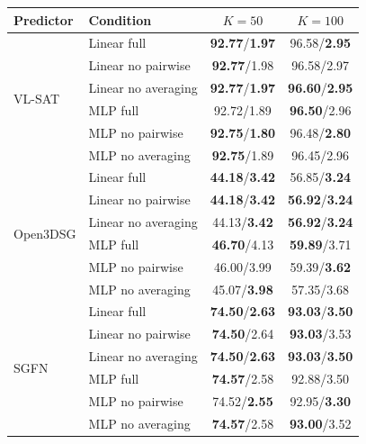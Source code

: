\begin{center}
\centering
{\small
\setlength{\tabcolsep}{1.7pt}
\begin{tabular}{llcc}
\toprule
Predictor & Condition & $K=50$ & $K=100$ \\
\midrule
\multirow{6}{*}{VL-SAT}
 & Linear full & \textbf{92.77}/\textbf{1.97} & 96.58/\textbf{2.95} \\
 & Linear no pairwise & \textbf{92.77}/1.98 & 96.58/2.97 \\
 & Linear no averaging & \textbf{92.77}/\textbf{1.97} & \textbf{96.60}/\textbf{2.95} \\
 & MLP full & 92.72/1.89 & \textbf{96.50}/2.96 \\
 & MLP no pairwise & \textbf{92.75}/\textbf{1.80} & 96.48/\textbf{2.80} \\
 & MLP no averaging & \textbf{92.75}/1.89 & 96.45/2.96 \\
\midrule
\multirow{6}{*}{Open3DSG}
 & Linear full & \textbf{44.18}/\textbf{3.42} & 56.85/\textbf{3.24} \\
 & Linear no pairwise & \textbf{44.18}/\textbf{3.42} & \textbf{56.92}/\textbf{3.24} \\
 & Linear no averaging & 44.13/\textbf{3.42} & \textbf{56.92}/\textbf{3.24} \\
 & MLP full & \textbf{46.70}/4.13 & \textbf{59.89}/3.71 \\
 & MLP no pairwise & 46.00/3.99 & 59.39/\textbf{3.62} \\
 & MLP no averaging & 45.07/\textbf{3.98} & 57.35/3.68 \\
\midrule
\multirow{6}{*}{SGFN}
 & Linear full & \textbf{74.50}/\textbf{2.63} & \textbf{93.03}/\textbf{3.50} \\
 & Linear no pairwise & \textbf{74.50}/2.64 & \textbf{93.03}/3.53 \\
 & Linear no averaging & \textbf{74.50}/\textbf{2.63} & \textbf{93.03}/\textbf{3.50} \\
 & MLP full & \textbf{74.57}/2.58 & 92.88/3.50 \\
 & MLP no pairwise & 74.52/\textbf{2.55} & 92.95/\textbf{3.30} \\
 & MLP no averaging & \textbf{74.57}/2.58 & \textbf{93.00}/3.52 \\
\bottomrule
\end{tabular}
}
\label{tab:component-removals}
\end{center}

